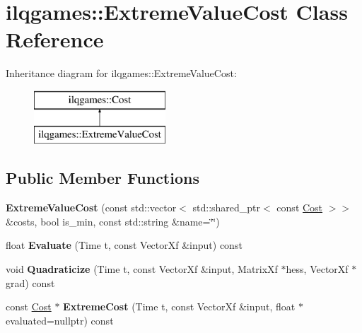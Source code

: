 \hypertarget{classilqgames_1_1_extreme_value_cost}{}\section{ilqgames\+:\+:Extreme\+Value\+Cost Class Reference}
\label{classilqgames_1_1_extreme_value_cost}
Inheritance diagram for ilqgames\+:\+:Extreme\+Value\+Cost\+:\begin{figure}[H]
\begin{center}
\leavevmode
\includegraphics[height=2.000000cm]{classilqgames_1_1_extreme_value_cost}
\end{center}
\end{figure}
\subsection*{Public Member Functions}
\begin{DoxyCompactItemize}
\item 
{\bfseries Extreme\+Value\+Cost} (const std\+::vector$<$ std\+::shared\+\_\+ptr$<$ const \hyperlink{classilqgames_1_1_cost}{Cost} $>$$>$ \&costs, bool is\+\_\+min, const std\+::string \&name=\char`\"{}\char`\"{})\hypertarget{classilqgames_1_1_extreme_value_cost_abfc02bd3700be88b9ac3370d17e1aa78}{}\label{classilqgames_1_1_extreme_value_cost_abfc02bd3700be88b9ac3370d17e1aa78}

\item 
float {\bfseries Evaluate} (Time t, const Vector\+Xf \&input) const \hypertarget{classilqgames_1_1_extreme_value_cost_a90b48a84e25ad4f4c165b6badfb987ba}{}\label{classilqgames_1_1_extreme_value_cost_a90b48a84e25ad4f4c165b6badfb987ba}

\item 
void {\bfseries Quadraticize} (Time t, const Vector\+Xf \&input, Matrix\+Xf $\ast$hess, Vector\+Xf $\ast$grad) const \hypertarget{classilqgames_1_1_extreme_value_cost_ae248e63aededf45ef64481c8174abf53}{}\label{classilqgames_1_1_extreme_value_cost_ae248e63aededf45ef64481c8174abf53}

\item 
const \hyperlink{classilqgames_1_1_cost}{Cost} $\ast$ {\bfseries Extreme\+Cost} (Time t, const Vector\+Xf \&input, float $\ast$evaluated=nullptr) const \hypertarget{classilqgames_1_1_extreme_value_cost_a20c6e9104fb7a84d86828f3204e8d248}{}\label{classilqgames_1_1_extreme_value_cost_a20c6e9104fb7a84d86828f3204e8d248}

\end{DoxyCompactItemize}
